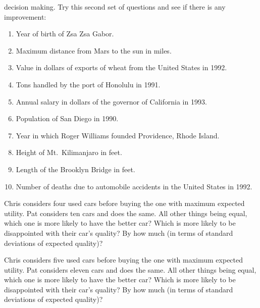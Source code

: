 \begin{exercise}
decision making.  Try this second set of questions and see if there is any
improvement: 
\begin{enumerate}
\item Year of birth of Zsa Zsa Gabor. %
\item Maximum distance from Mars to the sun in miles. %
\item Value in dollars of exports of wheat from the United States in 1992.  %
\item Tons handled by the port of Honolulu in 1991. %
\item Annual salary in dollars of the governor of California in 1993. %
\item Population of San Diego in 1990. %
\item Year in which Roger Williams founded Providence, Rhode Island. %
\item Height of Mt.~Kilimanjaro in feet. %
\item Length of the Brooklyn Bridge in feet. %
\item Number of deaths due to automobile accidents in the United States in 1992.
\end{enumerate}
\end{exercise} 

\begin{uexercise}
Chris considers four used cars before buying the one with maximum
expected utility.  Pat considers ten cars and does the same.  
All other things being equal, which one is more likely to have the
better car?  Which is more likely to be disappointed with their car's
quality? By how much (in terms of standard deviations of expected
quality)?
\end{uexercise} 

\begin{iexercise}
Chris considers five used cars before buying the one with maximum
expected utility.  Pat considers eleven cars and does the same.  
All other things being equal, which one is more likely to have the
better car?  Which is more likely to be disappointed with their car's
quality? By how much (in terms of standard deviations of expected
quality)?
\end{iexercise} 

